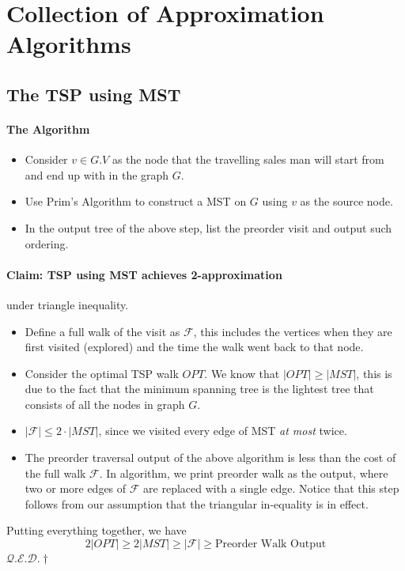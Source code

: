 \documentclass[10pt]{article}
\newcommand{\qed}{\hfill $\mathcal{Q}.\mathcal{E}.\mathcal{D}.\dagger$}
\begin{document}
\section{Collection of Approximation Algorithms}
\subsection{The TSP using MST}

\paragraph{The Algorithm}
\begin{itemize}
    \item Consider $v\in G.V$ as the node that the travelling sales man will start from and end up with in the graph $G$.
    \item Use Prim's Algorithm to construct a MST on $G$ using $v$ as the source node.
    \item In the output tree of the above step, list the preorder visit and output such ordering.
\end{itemize}

\paragraph{Claim: TSP using MST achieves 2-approximation} under triangle inequality. 
\begin{itemize}
    \item Define a full walk of the visit as $\mathcal{F}$, this includes the vertices when  they are first visited (explored) and the time the walk went back to that node. 
    \item Consider the optimal TSP walk $OPT$. We know that $|OPT|\geq |MST|$, this is due to the fact that the minimum spanning tree is the lightest tree that consists of all the nodes in graph $G$. 
    \item $|\mathcal{F}|\leq 2 \cdot |MST|$, since we visited every edge of MST \textit{at most} twice.
    \item The preorder traversal output of the above algorithm is less than the cost of the full walk $\mathcal{F}$. In algorithm, we print preorder walk as the output, where two or more edges of $\mathcal{F}$ are replaced with a single edge. Notice that this step follows from our assumption that the triangular in-equality is in effect. 
\end{itemize}
Putting everything together, we have
\begin{equation*}
    2 |OPT| \geq 2 |MST| \geq |\mathcal{F}| \geq \text{Preorder Walk Output}
\end{equation*}
\qed
\end{document}
